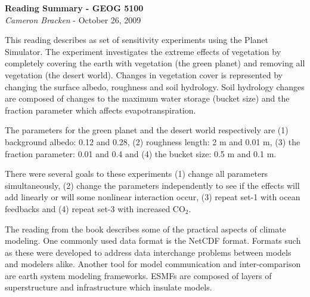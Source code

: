 \documentclass[11pt,oneside]{article}
\begin{document}
\begin{center}
	\textbf{Reading Summary - GEOG 5100}\\
	{\itshape Cameron Bracken} - October 26, 2009
\end{center}

This reading describes as set of sensitivity experiments using the Planet Simulator.  The experiment investigates the extreme effects of vegetation by completely covering the earth with vegetation (the green planet) and removing all vegetation (the desert world).  Changes in vegetation cover is represented by changing the surface albedo, roughness and soil hydrology.  Soil hydrology changes are composed of changes to the maximum water storage (bucket size) and the fraction parameter which affects evapotranspiration.

The parameters for the green planet and the desert world respectively are (1) background albedo: 0.12 and 0.28, (2) roughness length: 2 m and 0.01 m, (3) the fraction parameter: 0.01 and 0.4 and (4) the bucket size: 0.5 m and 0.1 m.  

There were several goals to these experiments (1) change all parameters simultaneously, (2) change the parameters independently to see if the effects will add linearly or will some nonlinear interaction occur, (3) repeat set-1 with ocean feedbacks and (4) repeat set-3 with increased CO$_2$. 

The reading from the book describes some of the practical aspects of climate modeling.  One commonly used data format is the NetCDF format. Formats such as these were developed to address data interchange problems between models and modelers alike. Another tool for model communication and inter-comparison are earth system modeling frameworks. ESMFs are composed of layers of superstructure and infrastructure which insulate models. 
 
\end{document}
